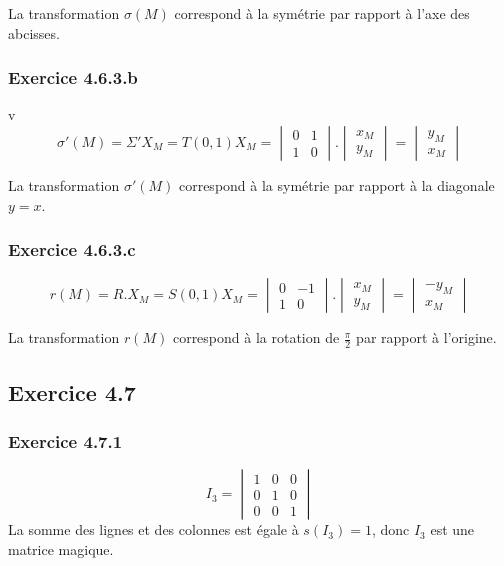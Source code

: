\documentclass[]{book}
\theoremstyle{definition}
\begin{document}
La transformation $\sigma(M)$ correspond \`a la sym\'etrie par rapport \`a l'axe des abcisses.

\subsubsection*{Exercice 4.6.3.b}v 
$$\sigma'(M) = \Sigma' X_M = T(0,1) X_M = \begin{vmatrix} 0 & 1 \\ 1 & 0 \end{vmatrix} . \begin{vmatrix} x_M \\ y_M \end{vmatrix} =
\begin{vmatrix} y_M \\ x_M \end{vmatrix}
$$

La transformation $\sigma'(M)$ correspond \`a la sym\'etrie par rapport \`a la diagonale $y=x$.\\

\subsubsection*{Exercice 4.6.3.c}
$$r(M) = R.X_M = S(0,1) X_M = \begin{vmatrix} 0 & -1 \\ 1 & 0 \end{vmatrix} . \begin{vmatrix} x_M \\ y_M \end{vmatrix} =
\begin{vmatrix} -y_M \\ x_M \end{vmatrix}
$$

La transformation $r(M)$ correspond \`a la rotation de $\frac{\pi}{2}$ par rapport \`a l'origine.\\

\subsection*{Exercice 4.7}
\subsubsection*{Exercice 4.7.1}
$$I_3 = \begin{vmatrix} 1 & 0 & 0 \\ 0 & 1 & 0 \\ 0 & 0 & 1 \end{vmatrix}$$
La somme des lignes et des colonnes est \'egale \`a $s(I_3) = 1$, donc $I_3$ est une matrice magique.\\
\end{document}
